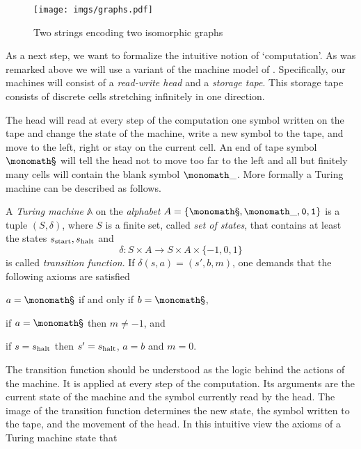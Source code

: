 \begin{center}
  \begin{figure}
    \texttt{[image: imgs/graphs.pdf]}
    \caption{Two strings encoding two isomorphic graphs}
    \label{fig:encoding of graphs}
  \end{figure}
\end{center}

As a next step, we want to formalize the intuitive notion of ‘computation’. As
was remarked above we will use a variant of the machine model of
\textcite{Turing1936}. Specifically, our machines will consist of a
\emph{read-write head} and a \emph{storage tape}. This storage tape consists of
discrete cells stretching infinitely in one direction.

The head will read at every step of the computation one symbol written on the
tape and change the state of the machine, write a new symbol to the tape, and
move to the left, right or stay on the current cell. An end of tape symbol
\(\sta\) will tell the head not to move too far to the left and all but finitely
many cells will contain the blank symbol \(\emp\). More formally a Turing
machine can be described as follows.

\begin{defin}
  A \emph{Turing machine} $\mathbb A$ on the \emph{alphabet} $A = \lbrace \sta,
  \emp, \zer, \one \rbrace$ is a tuple $(S, δ)$, where $S$ is a finite set,
  called \emph{set of states}, that contains at least the states \(s_{\text{start}},
  s_{\text{halt}}\) and
  \[
    δ: S × A → S × A × \lbrace -1, 0, 1 \rbrace
  \]
  is called \emph{transition function}. If $δ(s, a) = (s', b, m)$, one
  demands that the following axioms are satisfied

  \begin{thmlist}
  \item
    $a = \sta$ if and only if $b = \sta$,
  \item
    if $a = \sta$ then $m ≠ -1$, and
  \item
    if $s = s_{\text{halt}}$ then $s' = s_{\text{halt}}$, $a = b$ and $m = 0$.
  \end{thmlist}
\end{defin}

The transition function should be understood as the logic behind the actions of
the machine. It is applied at every step of the computation. Its arguments are
the current state of the machine and the symbol currently read by the head. The
image of the transition function determines the new state, the symbol written to
the tape, and the movement of the head. In this intuitive view the axioms of a
Turing machine state that

